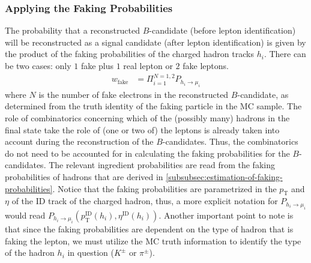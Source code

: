 \subsubsection{Applying the Faking Probabilities}
\label{subsec:applying-the-faking-probabilities}
The probability that a reconstructed $B$-candidate (before lepton identification) will be reconstructed as a signal candidate (after lepton identification) is given by the product of the faking probabilities of the charged hadron tracks $h_i$. %
There can be two cases: only $1$ fake plus $1$ real lepton or $2$ fake leptons. %
\begin{align}
    w_{\text{fake}} &= \Pi_{i=1}^{N=1,2}P_{h_i \to \mu_i}
\end{align}
where $N$ is the number of fake electrons in the reconstructed $B$-candidate, as determined from the truth identity of the faking particle in the MC sample. %
The role of combinatorics concerning which of the (possibly many) hadrons in the final state take the role of (one or two of) the leptons is already taken into account during the reconstruction of the $B$-candidates. %
Thus, the combinatorics do not need to be accounted for in calculating the faking probabilities for the $B$-candidates. %
The relevant ingredient probabilities are read from the faking probabilities of hadrons that are derived in \ref{subsubsec:estimation-of-faking-probabilities}. Notice that the faking probabilities are parametrized in the $p_{\text{T}}$ and $\eta$ of the ID track of the charged hadron, thus, a more explicit notation for $P_{h_i \rightarrow \mu_i}$ would read $P_{h_i \rightarrow \mu_i}(p_{\text{T}}^{\text{ID}}(h_i), \eta^{\text{ID}}(h_i))$. %
Another important point to note is that since the faking probabilities are dependent on the type of hadron that is faking the lepton, we must utilize the MC truth information to identify the type of the hadron $h_i$ in question ($K^\pm$ or $\pi^\pm$). %

